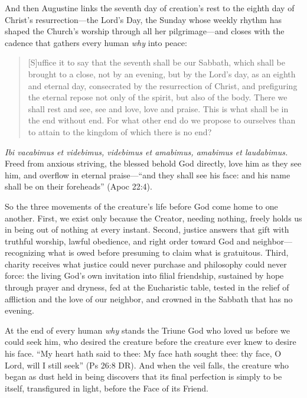 And then Augustine links the seventh day of creation's rest to the eighth day of Christ's resurrection---the Lord's Day, the Sunday whose weekly rhythm has shaped the Church's worship through all her pilgrimage---and closes with the cadence that gathers every human \emph{why} into peace:

\begin{quote}
[S]uffice it to say that the seventh shall be our Sabbath, which shall be brought to a close, not by an evening, but by the Lord's day, as an eighth and eternal day, consecrated by the resurrection of Christ, and prefiguring the eternal repose not only of the spirit, but also of the body. There we shall rest and see, see and love, love and praise. This is what shall be in the end without end. For what other end do we propose to ourselves than to attain to the kingdom of which there is no end?
\end{quote}

\emph{Ibi vacabimus et videbimus, videbimus et amabimus, amabimus et laudabimus.} Freed from anxious striving, the blessed behold God directly, love him as they see him, and overflow in eternal praise---``and they shall see his face: and his name shall be on their foreheads'' (Apoc 22:4).

\medskip

So the three movements of the creature's life before God come home to one another. First, we exist only because the Creator, needing nothing, freely holds us in being out of nothing at every instant. Second, justice answers that gift with truthful worship, lawful obedience, and right order toward God and neighbor---recognizing what is owed before presuming to claim what is gratuitous. Third, charity receives what justice could never purchase and philosophy could never force: the living God's own invitation into filial friendship, sustained by hope through prayer and dryness, fed at the Eucharistic table, tested in the relief of affliction and the love of our neighbor, and crowned in the Sabbath that has no evening.

At the end of every human \emph{why} stands the Triune God who loved us before we could seek him, who desired the creature before the creature ever knew to desire his face. ``My heart hath said to thee: My face hath sought thee: thy face, O Lord, will I still seek'' (Ps 26:8 DR). And when the veil falls, the creature who began as dust held in being discovers that its final perfection is simply to be itself, transfigured in light, before the Face of its Friend.
